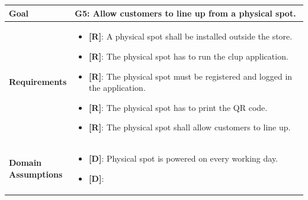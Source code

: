 \begin{table}[H]
\centering
\begin{tabular}{| m{} | m{} |} 
	\hline
	\textbf{Goal} &
		\textbf{G5: Allow customers to line up from a physical spot.} \\
	\hline
	\textbf{Requirements} &
		\begin{itemize}
			\item {\textbf{[R]}}: A physical spot shall be installed outside the store. %
			\item {\textbf{[R]}}: The physical spot has to run the \gls{clup} application.
			\item {\textbf{[R]}}: The physical spot must be registered and logged in the application.
			\item {\textbf{[R]}}: The physical spot has to print the QR code.
			\item {\textbf{[R]}}: The physical spot shall allow customers to line up.
		\end{itemize} \\ 
	\hline
	\shortstack[l]{\textbf{Domain} \\ \textbf{Assumptions}} & 
		\begin{itemize}
			\item {\textbf{[D]}}: Physical spot is powered on every working day.
			\item {\textbf{[D]}}:
		\end{itemize} \\ 
	\hline
\end{tabular}
\end{table}

